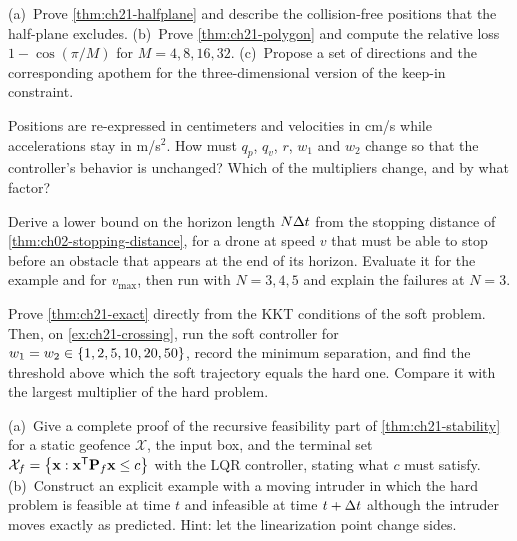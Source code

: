 \begin{exercise}[\difficulty{2}]
\label{exr:ch21-halfplane}
(a)~Prove \cref{thm:ch21-halfplane} and describe the collision-free
positions that the half-plane excludes. (b)~Prove \cref{thm:ch21-polygon}
and compute the relative loss $1-\cos(\pi/M)$ for $M=4,8,16,32$.
(c)~Propose a set of directions and the corresponding apothem for the
three-dimensional version of the keep-in constraint.
\end{exercise}

\begin{exercise}[\difficulty{1}]
\label{exr:ch21-weights}
Positions are re-expressed in centimeters and velocities in cm/s while
accelerations stay in m/s$^2$. How must $q_p$, $q_v$, $r$, $w_1$ and $w_2$
change so that the controller's behavior is unchanged? Which of the
multipliers change, and by what factor?
\end{exercise}

\begin{exercise}[\difficulty{2}]
\label{exr:ch21-horizon}
Derive a lower bound on the horizon length $N\Delta t$ from the stopping distance
of \cref{thm:ch02-stopping-distance}, for a drone at speed $v$ that must be able to stop before
an obstacle that appears at the end of its horizon. Evaluate it for the
example and for $v_{\max}$, then run  with $N=3,4,5$
and explain the failures at $N=3$.
\end{exercise}

\begin{exercise}[\difficulty{2}]
\label{exr:ch21-slack}
Prove \cref{thm:ch21-exact} directly from the KKT conditions of the soft
problem. Then, on \cref{ex:ch21-crossing}, run the soft controller for
$w_1=w_2\in\left\{ 1,2,5,10,20,50 \right\}$, record the minimum separation, and find
the threshold above which the soft trajectory equals the hard one. Compare it
with the largest multiplier of the hard problem.
\end{exercise}

\begin{exercise}[\difficulty{3}]
\label{exr:ch21-feasibility}
(a)~Give a complete proof of the recursive feasibility part of
\cref{thm:ch21-stability} for a static geofence $\mathcal{X}$, the input box,
and the terminal set $\mathcal{X}_f=\left\{ \mathbf{x}:\mathbf{x}^{\mathsf{T}}\mathbf{P}_f\mathbf{x}\le c \right\}$
with the LQR controller, stating what $c$ must satisfy. (b)~Construct an
explicit example with a moving intruder in which the hard problem is feasible
at time $t$ and infeasible at time $t+\Delta t$ although the intruder moves exactly
as predicted. Hint: let the linearization point change sides.
\end{exercise}

